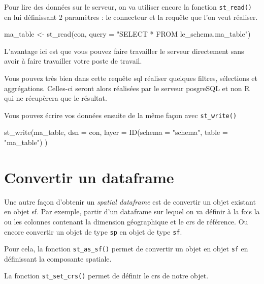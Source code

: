 \documentclass[
]{book}
\newenvironment{Shaded}{\begin{snugshade}}{\end{snugshade}}
\newcommand{\AttributeTok}[1]{\textcolor[rgb]{0.77,0.63,0.00}{#1}}
\newcommand{\FunctionTok}[1]{\textcolor[rgb]{0.00,0.00,0.00}{#1}}
\newcommand{\NormalTok}[1]{#1}
\newcommand{\OtherTok}[1]{\textcolor[rgb]{0.56,0.35,0.01}{#1}}
\newcommand{\StringTok}[1]{\textcolor[rgb]{0.31,0.60,0.02}{#1}}
\begin{document}
Pour lire des données sur le serveur, on va utiliser encore la fonction \texttt{st\_read()} en lui définissant 2 paramètres : le connecteur et la requête que l'on veut réaliser.

\begin{Shaded}
\begin{Highlighting}[]
\NormalTok{ma\_table }\OtherTok{\textless{}{-}} \FunctionTok{st\_read}\NormalTok{(con, }\AttributeTok{query =} \StringTok{"SELECT * FROM le\_schema.ma\_table"}\NormalTok{)}
\end{Highlighting}
\end{Shaded}

L'avantage ici est que vous pouvez faire travailler le serveur directement sans avoir à faire travailler votre poste de travail.

Vous pouvez très bien dans cette requête sql réaliser quelques filtres, sélections et aggrégations. Celles-ci seront alors réalisées par le serveur posgreSQL et non R qui ne récupèrera que le résultat.

Vous pouvez écrire vos données ensuite de la même façon avec \texttt{st\_write()}

\begin{Shaded}
\begin{Highlighting}[]
\FunctionTok{st\_write}\NormalTok{(ma\_table,}
  \AttributeTok{dsn =}\NormalTok{ con,}
  \AttributeTok{layer =} \FunctionTok{ID}\NormalTok{(}\AttributeTok{schema =} \StringTok{"schema"}\NormalTok{, }\AttributeTok{table =} \StringTok{"ma\_table"}\NormalTok{)}
\NormalTok{)}
\end{Highlighting}
\end{Shaded}

\hypertarget{convertir-un-dataframe}{%
\section{Convertir un dataframe}\label{convertir-un-dataframe}}

Une autre façon d'obtenir un \emph{spatial dataframe} est de convertir un objet existant en objet sf. Par exemple, partir d'un dataframe sur lequel on va définir à la fois la ou les colonnes contenant la dimension géographique et le crs de référence. Ou encore convertir un objet de type \texttt{sp} en objet de type \texttt{sf}.

Pour cela, la fonction \texttt{st\_as\_sf()} permet de convertir un objet en objet \texttt{sf} en définissant la composante spatiale.

La fonction \texttt{st\_set\_crs()} permet de définir le crs de notre objet.
\end{document}
